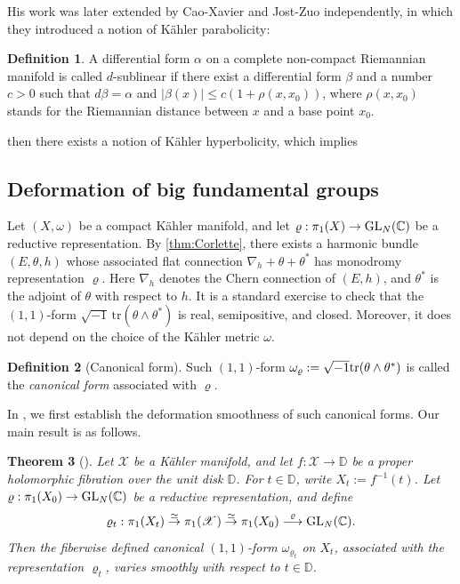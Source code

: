\documentclass[english]{amsproc}
\theoremstyle{plain}
\newtheorem{thm}{Theorem}[section]
\theoremstyle{definition}
\newtheorem{dfn}[thm]{Definition}
\theoremstyle{remark}
\theoremstyle{plain}
\numberwithin{equation}{thm} %
\newcommand{\sX}{\mathscr{X}}
\newcommand{\bC}{\mathbb{C}}
\newcommand{\bD}{\mathbb{D}}
\def\sn{\sqrt{-1}}
\newcommand{\GL}{{\rm GL}}
\begin{document}
	His work was later extended by Cao-Xavier and Jost-Zuo independently, in which they introduced a notion of K\"ahler parabolicity: 
	\begin{dfn}
		A differential form $\alpha$ on a complete non-compact Riemannian manifold is called $d$-sublinear if there exist a differential form $\beta$ and a number $c>0$ such that $d \beta=\alpha$ and $|\beta(x)| \leq c\left(1+\rho\left(x, x_0\right)\right)$, where $\rho\left(x, x_0\right)$ stands for the Riemannian distance between $x$ and a base point $x_0$.
	\end{dfn}
	
	then there exists a notion of K\"ahler hyperbolicity, which implies 
	\fi
	
	\subsection{Deformation of big fundamental groups}
Let $(X,\omega)$ be a compact K\"ahler manifold, and let
$\varrho:\pi_1(X)\to \GL_N(\bC)$ be a reductive representation.
By \cref{thm:Corlette}, there exists a harmonic bundle $(E,\theta,h)$
whose associated flat connection
$
\nabla_h+\theta+\theta^*
$ 
has monodromy representation $\varrho$.
Here $\nabla_h$ denotes the Chern connection of $(E,h)$, and
$\theta^*$ is the adjoint of $\theta$ with respect to $h$.
It is a standard exercise to check that the $(1,1)$-form
$
\sqrt{-1}\,\mathrm{tr}(\theta\wedge\theta^*)
$ 
is real, semipositive, and closed.
Moreover, it does not depend on the choice of the K\"ahler metric $\omega$.
	\begin{dfn}[Canonical form]\label{def:canonical form}
		Such $(1,1)$-form  $\omega_\varrho:=\sn{\rm tr}(\theta\wedge\theta^*)$ is called the \emph{canonical form} associated with $\varrho$.   
	\end{dfn}       
	In \cite{DMW24}, we first establish the deformation smoothness of such canonical forms. Our main result is as follows. 
\begin{thm}[{\cite[Remark~7.8]{DMW24}}]\label{harmonic2}
	Let $\sX$ be a K\"ahler manifold, and let
	$f:\sX\to \bD$ be a proper holomorphic fibration over the unit disk $\bD$.
	For $t\in\bD$, write $X_t:=f^{-1}(t)$.
	Let $\varrho:\pi_1(X_0)\to \GL_N(\bC)$ be a reductive representation, and define
	\begin{equation}\label{eq:t}
		\varrho_t:\pi_1(X_t)\stackrel{\simeq}{\to}\pi_1(\sX)\stackrel{\simeq}{\to}\pi_1(X_0)
		\stackrel{\varrho}{\longrightarrow}\GL_N(\bC).
	\end{equation}
	Then the fiberwise defined canonical $(1,1)$-form $\omega_{\varrho_t}$ on $X_t$,
	associated with the representation $\varrho_t$, varies smoothly with respect to
	$t\in\bD$.
\end{thm}
\end{document}
